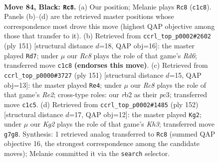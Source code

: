 \documentclass[11pt]{article}
\begin{document}
\clearpage

\begin{figure}[p]\centering
\begin{subfigure}{0.46\textwidth}\centering
\resizebox{\linewidth}{!}{%
\newchessgame
\chessboard[
  setfen={8/5pk1/R3p3/8/P3P3/5P2/1R5K/2r5 b - - 60 84},
  showmover=false,
  pgfstyle=straightmove, color=movearrow, markmove={c1-c8}
]}
\caption{}
\end{subfigure}\hfill
\begin{subfigure}{0.46\textwidth}\centering
\resizebox{\linewidth}{!}{%
\newchessgame
\chessboard[
  setfen={8/8/PR6/6pP/6P1/1pkr4/6K1/8 b - - 0 76},
  showmover=false,
  pgfstyle=straightmove, color=movearrow, markmove={d3-d7}
]}
\caption{}
\end{subfigure}
\\[4pt]
\begin{subfigure}{0.46\textwidth}\centering
\resizebox{\linewidth}{!}{%
\newchessgame
\chessboard[
  setfen={8/4r3/6k1/3R1p1p/2p5/2P3P1/3P1K2/8 b - - 3 76},
  showmover=false,
  pgfstyle=straightmove, color=movearrow, markmove={e7-e4}
]}
\caption{}
\end{subfigure}\hfill
\begin{subfigure}{0.46\textwidth}\centering
\resizebox{\linewidth}{!}{%
\newchessgame
\chessboard[
  setfen={8/1r4k1/3R1p2/4p2P/6P1/5P1K/8/8 w - - 55 77},
  showmover=false,
  pgfstyle=straightmove, color=movearrow, markmove={h3-g2}
]}
\caption{}
\end{subfigure}
\caption{\textbf{Move 84, Black: \texttt{Rc8}.} (a) Our position; Melanie plays \texttt{Rc8} (\texttt{c1c8}). Panels (b)--(d) are the retrieved master positions whose correspondence most drove this move (highest QAP objective among those that transfer to it). (b) Retrieved from \texttt{ccrl\_top\_p0002\#2602} (ply 151) [structural distance $d$=18, QAP obj=16]: the master played \texttt{Rd7}; under $\mu$ our \emph{Rc8} plays the role of that game's \emph{Rd6}; transferred move \texttt{c1c8} \textbf{(endorses this move)}. (c) Retrieved from \texttt{ccrl\_top\_p0000\#3727} (ply 151) [structural distance $d$=15, QAP obj=13]: the master played \texttt{Re4}; under $\mu$ our \emph{Rc8} plays the role of that game's \emph{Re2}; cross-type roles: our \emph{r}b2 as their \emph{p}c3; transferred move \texttt{c1c5}. (d) Retrieved from \texttt{ccrl\_top\_p0002\#1485} (ply 152) [structural distance $d$=17, QAP obj=12]: the master played \texttt{Kg2}; under $\mu$ our \emph{Kg2} plays the role of that game's \emph{Kh3}; transferred move \texttt{g7g8}. Synthesis: 1 retrieved analog transferred to \texttt{Rc8} (summed QAP objective 16, the strongest correspondence among the candidate moves); Melanie committed it via the \texttt{search} selector.}
\label{fig:thought-m167}
\end{figure}
\end{document}
